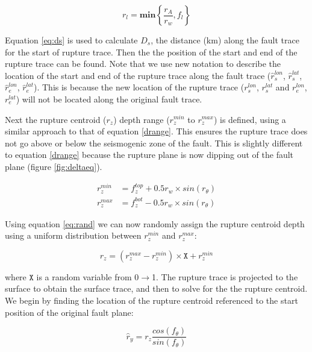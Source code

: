 \begin{equation}
r_l = \mathbf{min}\left\{\frac{r_A}{r_w}, f_l\right\}
\end{equation}

Equation \ref{eq:ds} is used to calculate $D_s$, the distance (km) along the fault trace for the start of rupture trace. Then the the position 
of the start and end of the rupture trace can be found. Note that we use new notation to describe the location of the start and end of the rupture trace along the 
fault trace ($\hat{r}_s^{lon}$, $\hat{r}_s^{lat}$, $\hat{r}_e^{lon}$, $\hat{r}_e^{lat}$). This is because the new location of the rupture 
trace ($r_s^{lon}$, $r_s^{lat}$ and $r_e^{lon}$, $r_e^{lat}$) will not be located along the original fault trace. 


Next the rupture centroid ($r_z$) depth range ($r_z^{min}$ to $r_z^{max}$) is defined, using a similar approach to that of equation \ref{drange}. This ensures 
the rupture trace does not go above or below the seismogenic zone of the fault. This is slightly different to equation \ref{drange} because the rupture 
plane is now dipping out of the fault plane (figure \ref{fig:deltaeq}).

\begin{subequations} \label{drange2}
\begin{align}
r_z^{min} & = f_z^{top} + 0.5r_w  \times sin(r_\theta)    \\
r_z^{max} & = f_z^{bot} - 0.5r_w  \times sin(r_\theta)  
\end{align}
\end{subequations}

Using equation \ref{eq:rand} we can now randomly assign the rupture centroid depth using a uniform distribution 
between $r_z^{min}$ and $r_z^{max}$:

\begin{equation}
r_z = ( r_z^{max}-r_z^{min} ) \times  \mathtt{X} +   r_z^{min}
\end{equation}

where $\mathtt{X}$ is a random variable from 0$\rightarrow$1. The rupture trace is projected to the surface to obtain the 
surface trace, and then to solve for the the rupture centroid. 
We begin by finding the location of the rupture centroid referenced to the start position of the original fault plane:

\begin{equation}\label{eq:ry}
\hat{r}_y = r_z  \frac{cos(f_\theta)}{sin(f_\theta)}
\end{equation}


